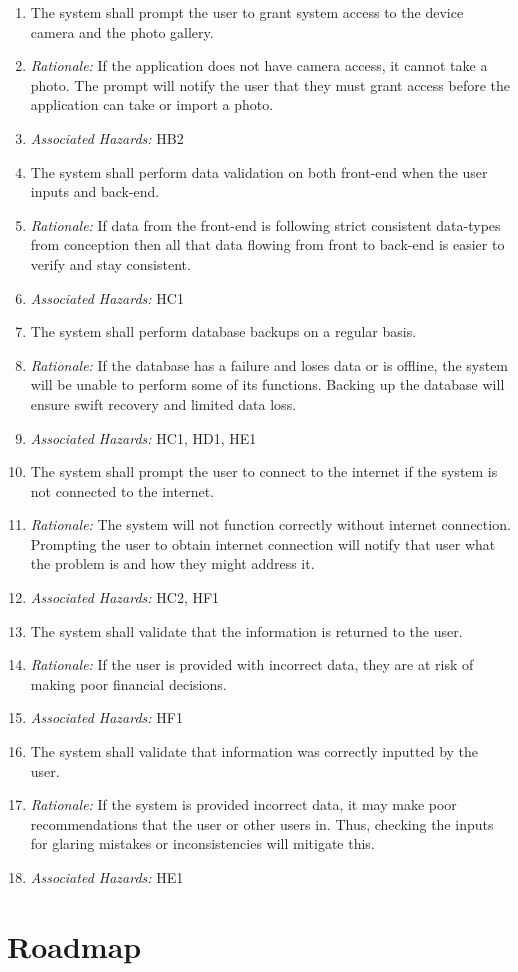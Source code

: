 \documentclass{article}
\begin{document}
\begin{enumerate}[label=SR\arabic*.]
    \item The system shall prompt the user to grant system access to the device camera and the photo gallery.
    \item[] \emph{Rationale:} If the application does not have camera access, it cannot take a photo. The prompt will notify the user that they must grant access before the application can take or import a photo.
    \item[] \emph{Associated Hazards:} HB2

    \item The system shall perform data validation on both front-end when the user inputs and back-end.
    \item[] \emph{Rationale:} If data from the front-end is following strict consistent data-types from conception then all that data flowing from front to back-end is easier to verify and stay consistent.
    \item[] \emph{Associated Hazards:} HC1

    \item The system shall perform database backups on a regular basis.
    \item[] \emph{Rationale:} If the database has a failure and loses data or is offline, the system will be unable to perform some of its functions. Backing up the database will ensure swift recovery and limited data loss.
    \item[] \emph{Associated Hazards:} HC1, HD1, HE1

    \item The system shall prompt the user to connect to the internet if the system is not connected to the internet.
    \item[] \emph{Rationale:} The system will not function correctly without internet connection. Prompting the user to obtain internet connection will notify that user what the problem is and how they might address it.
    \item[] \emph{Associated Hazards:} HC2, HF1

    \item The system shall validate that the information is returned to the user.
    \item[] \emph{Rationale:} If the user is provided with incorrect data, they are at risk of making poor financial decisions.
    \item[] \emph{Associated Hazards:} HF1

    \item The system shall validate that information was correctly inputted by the user.
    \item[] \emph{Rationale:} If the system is provided incorrect data, it may make poor recommendations that the user or other users in. Thus, checking the inputs for glaring mistakes or inconsistencies will mitigate this. 
    \item[] \emph{Associated Hazards:} HE1

\end{enumerate}

\section{Roadmap}

\end{document}
